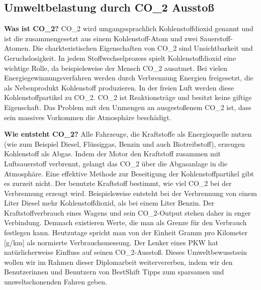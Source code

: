 \subsection{Umweltbelastung durch CO_{2} Ausstoß}

\textbf{Was ist CO_{2}?}
CO_{2} wird umgangssprachlich Kohlenstoffdioxid genannt und ist die zusammengesetzt aus einem Kohlenstoff-Atom und zwei Sauerstoff-Atomen. 
Die charkteristischen Eigenschaften von CO_{2} sind Unsichtbarkeit und Geruchslosigkeit. 
In jedem Stoffwechselprozess spielt Kohlenstoffdioxid eine wichtige Rolle, da beispielsweise der Mensch CO_{2} ausatmet. 
Bei vielen Energiegewinnungsverfahren werden durch Verbrennung Energien freigesetzt, die als Nebenprodukt Kohlenstoff produzieren. 
In der freien Luft werden diese Kohlenstoffpartikel zu CO_{2}. 
CO_{2} ist Reaktionsträge und besitzt keine giftige Eigenschaft. 
Das Problem mit den Unmengen an ausgestoßenem CO_{2} ist, dass sein massives Vorkommen die Atmosphäre beschädigt.

\textbf{Wie entsteht CO_{2}?}
Alle Fahrzeuge, die Kraftstoffe als Energiequelle nutzen 
(wie zum Beispiel Diesel, Flüssiggas, Benzin und auch Biotreibstoff), erzeugen Kohlenstoff als Abgas. 
Indem der Motor den Kraftstoff zusammen mit Luftsauerstoff verbrennt, gelangt das CO_{2} über die Abgasanlage in die Atmosphäre. 
Eine effektive Methode zur Beseitigung der Kohlenstoffpartikel gibt es zurzeit nicht. 
Der benutzte Kraftstoff bestimmt, wie viel CO_{2} bei der Verbrennung erzeugt wird. 
Beispielsweise entsteht bei der Verbrennung von einem Liter Diesel mehr Kohlenstoffdioxid, als bei einem Liter Benzin.
Der Kraftstoffverbrauch eines Wagens und sein CO_{2}-Output stehen daher in enger Verbindung. 
Demnach existieren Werte, die man als Grenze für den Verbrauch festlegen kann. 
Heutzutage spricht man von der Einheit Gramm pro Kilometer [g/km] als normierte Verbrauchsmessung.
Der Lenker eines PKW hat natürlicherweise Einfluss auf seinen CO_{2}-Ausstoß. 
Dieses Umweltbewusstsein wollen wir im Rahmen dieser Diplomarbeit weitervererben, indem wir den Benutzerinnen und Benutzern 
von BestShift Tipps zum sparsamen und umweltschonenden Fahren geben.

